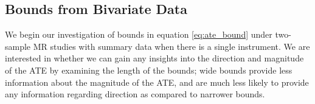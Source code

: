 \documentclass[
]{article}
\theoremstyle{plain}
\begin{document}
%
%
%

\hypertarget{bounds-from-bivariate-data}{%
\subsection{Bounds from Bivariate Data}\label{bounds-from-bivariate-data}}
We begin our investigation of bounds in equation \eqref{eq:ate_bound} under two-sample MR studies with summary data when there is a single instrument. We are interested in whether we can gain any insights into the direction and magnitude of the ATE by examining the length of the bounds; wide bounds provide less information about the magnitude of the ATE, and are much less likely to provide any information regarding direction as compared to narrower bounds. 
\end{document}
